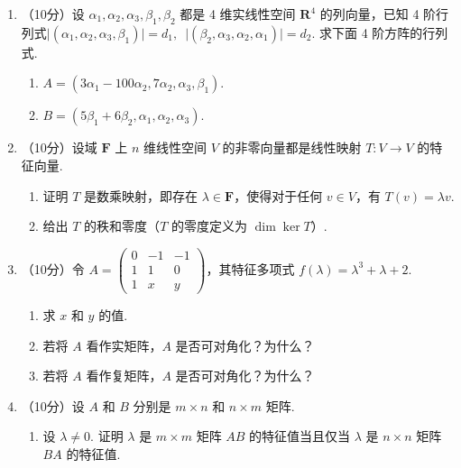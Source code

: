 \begin{enumerate}
    \item （10分）设 $\alpha_1,\alpha_2,\alpha_3,\beta_1,\beta_2$ 都是 4 维实线性空间 $\mathbf{R}^4$ 的列向量，已知 4 阶行列式$\lvert (\alpha_1,\alpha_2,\alpha_3,\beta_1) \rvert=d_1,\enspace \lvert (\beta_2,\alpha_3,\alpha_2,\alpha_1) \rvert = d_2$.  求下面 4 阶方阵的行列式.
    \begin{enumerate}
        \item $A=(3\alpha_1-100\alpha_2,7\alpha_2,\alpha_3,\beta_1)$.

        \item $B=(5\beta_1+6\beta_2,\alpha_1,\alpha_2,\alpha_3)$.
    \end{enumerate}

    \item （10分）设域 $\mathbf{F}$ 上 $n$ 维线性空间 $V$ 的非零向量都是线性映射 $T\colon V\to V$ 的特征向量.
    \begin{enumerate}
        \item 证明 $T$ 是数乘映射，即存在 $\lambda \in \mathbf{F}$，使得对于任何 $v \in V$，有 $T(v)=\lambda v$.

        \item 给出 $T$ 的秩和零度（$T$ 的零度定义为 $\dim \ker T$）.
    \end{enumerate}

    \item （10分）令 $A=\begin{pmatrix}0 & -1 & -1 \\ 1 & 1 & 0 \\ 1 & x & y\end{pmatrix}$，其特征多项式 $f(\lambda) = \lambda^3+\lambda+2$.
    \begin{enumerate}
        \item 求 $x$ 和 $y$ 的值.

        \item 若将 $A$ 看作实矩阵，$A$ 是否可对角化？为什么？

        \item 若将 $A$ 看作复矩阵，$A$ 是否可对角化？为什么？
    \end{enumerate}

    \item （10分）设 $A$ 和 $B$ 分别是 $m\times n$ 和 $n\times m$ 矩阵.
    \begin{enumerate}
        \item 设 $\lambda \neq 0$. 证明 $\lambda$ 是 $m\times m$ 矩阵 $AB$ 的特征值当且仅当 $\lambda$ 是 $n\times n$ 矩阵 $BA$ 的特征值.


\end{enumerate}
\end{enumerate}
